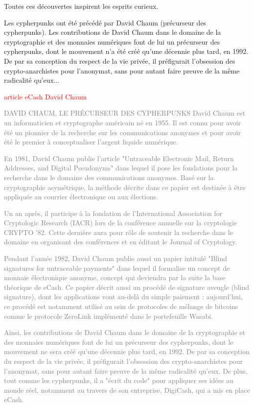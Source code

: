 
Toutes ces découvertes inspirent les esprits curieux.

Les cypherpunks ont été précédé par David Chaum (précurseur des cypherpunks). Les contributions de David Chaum dans le domaine de la cryptographie et des monnaies numériques font de lui un précurseur des cypherpunks, dont le mouvement n'a été créé qu'une décennie plus tard, en 1992. De par sa conception du respect de la vie privée, il préfigurait l'obsession des crypto-anarchistes pour l'anonymat, sans pour autant faire preuve de la même radicalité qu'eux...


\textcolor{red}{article eCash David Chaum}

\textcolor{gray}{DAVID CHAUM, LE PRÉCURSEUR DES CYPHERPUNKS David Chaum est un informaticien et cryptographe américain né en 1955. Il est connu pour avoir été un pionnier de la recherche sur les communications anonymes et pour avoir été le premier à conceptualiser l'argent liquide numérique.}

\textcolor{gray}{En 1981, David Chaum publie l'article "Untraceable Electronic Mail, Return Addresses, and Digital Pseudonyms" dans lequel il pose les fondations pour la recherche dans le domaine des communications anonymes. Basé sur la cryptographie asymétrique, la méthode décrite dans ce papier est destinée à être appliquée au courrier électronique ou aux élections.}

\textcolor{gray}{Un an après, il participe à la fondation de l'International Association for Cryptologic Research (IACR) lors de la conférence annuelle sur la cryptologie CRYPTO '82. Cette dernière aura pour rôle de soutenir la recherche dans le domaine en organisant des conférences et en éditant le Journal of Cryptology.}

\textcolor{gray}{Pendant l'année 1982, David Chaum publie aussi un papier intitulé "Blind signatures for untraceable payments" dans lequel il formalise un concept de monnaie électronique anonyme, concept qui deviendra par la suite la base théorique de eCash. Ce papier décrit aussi un procédé de signature aveugle (blind signature), dont les applications vont au-delà du simple paiement : aujourd'hui, ce procédé est notamment utilisé au sein de protocoles de mélange de bitcoins comme le protocole ZeroLink implémenté dans le portefeuille Wasabi.}

\textcolor{gray}{Ainsi, les contributions de David Chaum dans le domaine de la cryptographie et des monnaies numériques font de lui un précurseur des cypherpunks, dont le mouvement ne sera créé qu'une décennie plus tard, en 1992. De par sa conception du respect de la vie privée, il préfigurait l'obsession des crypto-anarchistes pour l'anonymat, sans pour autant faire preuve de la même radicalité qu'eux. De plus, tout comme les cypherpunks, il a "écrit du code" pour appliquer ses idées au monde réel, notamment au travers de son entreprise, DigiCash, qui a mis en place eCash.}

